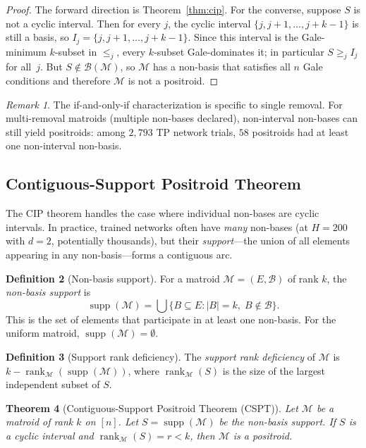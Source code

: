 \documentclass[11pt]{article}
\newtheorem{theorem}{Theorem}[section]
\theoremstyle{definition}
\newtheorem{definition}[theorem]{Definition}
\theoremstyle{remark}
\newtheorem{remark}[theorem]{Remark}
\newcommand{\cB}{\mathcal{B}}
\newcommand{\cM}{\mathcal{M}}
\DeclareMathOperator{\rank}{rank}
\DeclareMathOperator{\supp}{supp}
\begin{document}
\begin{proof}
  The forward direction is Theorem~\ref{thm:cip}.  For the converse,
  suppose $S$ is not a cyclic interval.  Then for every $j$, the
  cyclic interval $\{j, j{+}1, \ldots, j{+}k{-}1\}$ is still a
  basis, so $I_j = \{j, j{+}1, \ldots, j{+}k{-}1\}$.  Since this
  interval is the Gale-minimum $k$-subset in $\leq_j$, every
  $k$-subset Gale-dominates it; in particular $S \geq_j I_j$ for
  all~$j$.  But $S \notin \cB(\cM)$, so $\cM$ has a non-basis that
  satisfies all $n$ Gale conditions and therefore $\cM$ is not a
  positroid.
\end{proof}

\begin{remark}
  The if-and-only-if characterization is specific to single removal.
  For multi-removal matroids (multiple non-bases declared),
  non-interval non-bases can still yield positroids: among $2{,}793$
  TP network trials, $58$ positroids had at least one non-interval
  non-basis.
\end{remark}


\subsection{Contiguous-Support Positroid Theorem}\label{sec:cspt}

The CIP theorem handles the case where individual non-bases are
cyclic intervals.  In practice, trained networks often have
\emph{many} non-bases (at $H = 200$ with $d = 2$, potentially
thousands), but their \emph{support}---the union of all elements
appearing in any non-basis---forms a contiguous arc.

\begin{definition}[Non-basis support]\label{def:support}
  For a matroid $\cM = (E, \cB)$ of rank $k$, the \emph{non-basis
  support} is
  \[
    \supp(\cM) = \bigcup \bigl\{ B \subseteq E : |B| = k,\;
    B \notin \cB \bigr\}.
  \]
  This is the set of elements that participate in at least one
  non-basis.  For the uniform matroid, $\supp(\cM) = \emptyset$.
\end{definition}

\begin{definition}[Support rank deficiency]\label{def:rank-deficiency}
  The \emph{support rank deficiency} of $\cM$ is
  $k - \rank_\cM(\supp(\cM))$, where $\rank_\cM(S)$ is the size of
  the largest independent subset of $S$.
\end{definition}

\begin{theorem}[Contiguous-Support Positroid Theorem (CSPT)]
\label{thm:cspt}
  Let $\cM$ be a matroid of rank $k$ on $[n]$.  Let $S = \supp(\cM)$
  be the non-basis support.  If $S$ is a cyclic interval and
  $\rank_\cM(S) = r < k$, then $\cM$ is a positroid.
\end{theorem}
\end{document}
